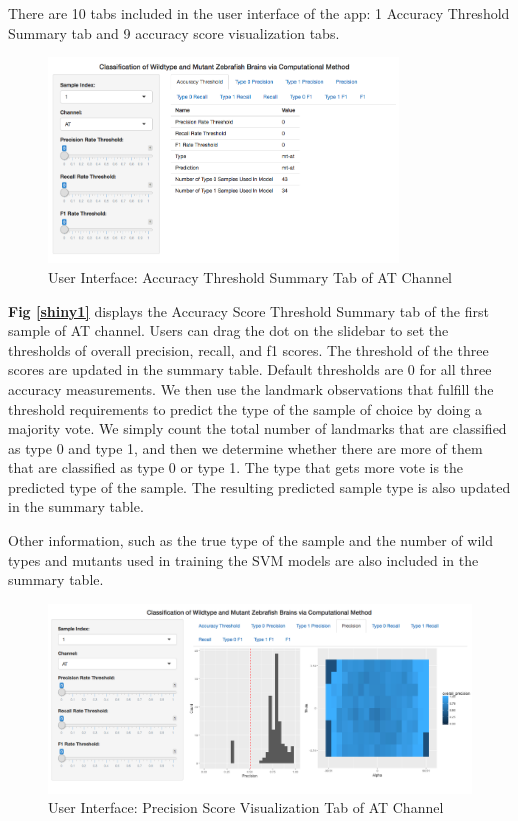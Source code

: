 \documentclass[10pt,letterpaper]{article}
\begin{document}
There are 10 tabs included in the user interface of the app: 1 Accuracy
Threshold Summary tab and 9 accuracy score visualization tabs.

\begin{figure}[h]

{\centering \includegraphics[width=3.66in]{figures/shiny1} 

}

\caption{\label{shiny1} User Interface: Accuracy Threshold Summary Tab of AT Channel}\label{fig:unnamed-chunk-10}
\end{figure}

\textbf{Fig \ref{shiny1}} displays the Accuracy Score Threshold Summary
tab of the first sample of AT channel. Users can drag the dot on the
slidebar to set the thresholds of overall precision, recall, and f1
scores. The threshold of the three scores are updated in the summary
table. Default thresholds are 0 for all three accuracy measurements. We
then use the landmark observations that fulfill the threshold
requirements to predict the type of the sample of choice by doing a
majority vote. We simply count the total number of landmarks that are
classified as type 0 and type 1, and then we determine whether there are
more of them that are classified as type 0 or type 1. The type that gets
more vote is the predicted type of the sample. The resulting predicted
sample type is also updated in the summary table.

Other information, such as the true type of the sample and the number of
wild types and mutants used in training the SVM models are also included
in the summary table.

\begin{figure}[h]

{\centering \includegraphics[width=4.92in]{figures/shiny2} 

}

\caption{\label{shiny2} User Interface: Precision Score Visualization Tab of AT Channel}\label{fig:unnamed-chunk-11}
\end{figure}
\end{document}
